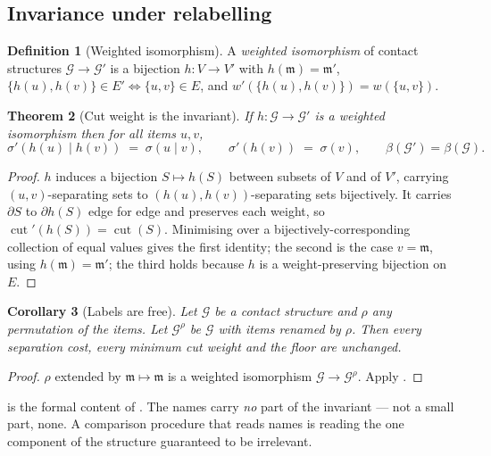 \documentclass[11pt,twocolumn,a4paper]{article}
\theoremstyle{plain}
\newtheorem{theorem}{Theorem}[section]
\newtheorem{corollary}[theorem]{Corollary}
\theoremstyle{definition}
\newtheorem{definition}[theorem]{Definition}
\theoremstyle{remark}
\newcommand{\flo}{\beta}                       %
\newcommand{\sep}{\sigma}                      %
\newcommand{\med}{\mathfrak{m}}                %
\newcommand{\Gph}{\mathcal{G}}
\newcommand{\Ver}{V}
\newcommand{\Edg}{E}
\newcommand{\weight}{w}
\DeclareMathOperator{\cut}{cut}
\begin{document}
\subsection{Invariance under relabelling}

\begin{definition}[Weighted isomorphism]
\label{def:iso}
A \emph{weighted isomorphism} of contact structures
$\Gph\to\Gph'$ is a bijection $h:\Ver\to\Ver'$ with $h(\med)=\med'$,
$\{h(u),h(v)\}\in\Edg' \iff \{u,v\}\in\Edg$, and
$\weight'(\{h(u),h(v)\})=\weight(\{u,v\})$.
\end{definition}

\begin{theorem}[Cut weight is the invariant]
\label{thm:invariant-cut}
If $h:\Gph\to\Gph'$ is a weighted isomorphism then for all items $u,v$,
\[
  \sep'(h(u)\mid h(v)) \;=\; \sep(u\mid v),
  \qquad
  \sep'(h(v)) \;=\; \sep(v),
  \qquad
  \flo(\Gph')=\flo(\Gph).
\]
\end{theorem}

\begin{proof}
$h$ induces a bijection $S\mapsto h(S)$ between subsets of $\Ver$ and of
$\Ver'$, carrying $(u,v)$-separating sets to $(h(u),h(v))$-separating
sets bijectively. It carries $\partial S$ to $\partial h(S)$ edge for
edge and preserves each weight, so $\cut'(h(S))=\cut(S)$. Minimising
over a bijectively-corresponding collection of equal values gives the
first identity; the second is the case $v=\med$, using $h(\med)=\med'$;
the third holds because $h$ is a weight-preserving bijection on $\Edg$.
\end{proof}

\begin{corollary}[Labels are free]
\label{cor:labels}
Let $\Gph$ be a contact structure and $\rho$ any permutation of the
items. Let $\Gph^\rho$ be $\Gph$ with items renamed by $\rho$. Then
every separation cost, every minimum cut weight and the floor are
unchanged.
\end{corollary}

\begin{proof}
$\rho$ extended by $\med\mapsto\med$ is a weighted isomorphism
$\Gph\to\Gph^\rho$. Apply .
\end{proof}

 is the formal content of . The names
carry \emph{no} part of the invariant --- not a small part, none. A
comparison procedure that reads names is reading the one component of
the structure guaranteed to be irrelevant.
\end{document}
